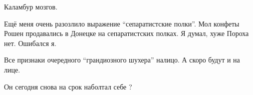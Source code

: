 \begin{itemize}
Каламбур мозгов.

Ещё меня очень разозлило выражение \enquote{сепаратистские полки}. Мол конфеты Рошен продавались в Донецке на сепаратистских полках.
Я думал, хуже Пороха нет. Ошибался я.

Все признаки очередного \enquote{грандиозного шухера} налицо.
А скоро будут и на лице.

Он сегодня снова на срок наболтал себе ?

\end{itemize} %
